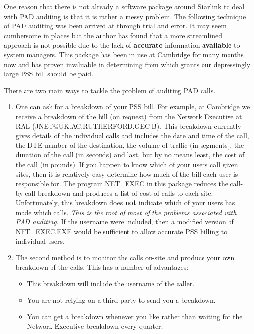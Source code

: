 One reason that there is not already a software package around Starlink to
deal with PAD auditing is that it is rather a messy problem. The following
technique of PAD auditing was been arrived at through trial and error. It
may seem cumbersome in places but the author has found that a more
streamlined approach is not possible due to the lack of {\bf accurate}
 information
{\bf available} to system managers. This package has been in use at Cambridge
for many months now and has proven invaluable in determining from which grants
our depressingly large PSS bill should be paid. 

There are two main ways to tackle the problem of auditing PAD calls.

\begin{enumerate}

\item One can ask for a breakdown of your PSS bill. For example, at
Cambridge we receive a breakdown of the bill (on request) from the Network
Executive at RAL (JNET@UK.AC.RUTHERFORD.GEC-B). This breakdown currently
gives details of the individual calls and includes the date and time of the
call, the DTE number of the destination, the volume of traffic (in
segments), the duration of the call (in seconds) and last, but by no means
least, the cost of the call (in pounds). If you happen to know  which of
your users call given sites, then it is relatively easy determine how much
of the bill each user is responsible for. The program NET\_\/EXEC in this
package reduces the call-by-call breakdown and produces a list of cost of
calls to each site. Unfortunately, this breakdown does {\bf not} indicate which of
your users has made which calls. {\it This is the root of most of the problems
associated with PAD auditing.} If the username were included, then a modified
version of NET\_\/EXEC.EXE would be sufficient to allow accurate PSS billing to
individual users. 

\item The second method is to monitor the calls on-site and produce your own
breakdown of the calls. This has a number of advantages: 

\begin{itemize}

\item This breakdown will include the username of the caller. 

\item You are not relying on a third party to send you a breakdown. 

\item You can get a breakdown whenever you like rather than 
waiting for the Network Executive breakdown every quarter.


\end{itemize}
\end{enumerate}

